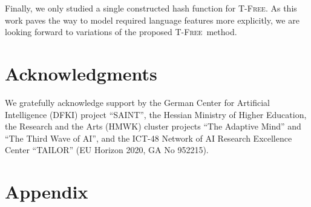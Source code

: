 \documentclass[11pt]{article}
\newcommand{\mb}[1]{\textcolor{blue}{MB: #1}}
\newcommand{\method}{\textsc{T-Free}}
\begin{document}

Finally, we only studied a single constructed hash function for \method. As this work paves the way to model required language features more explicitly, we are looking forward to variations of the proposed \method~method.


\section*{Acknowledgments}


We gratefully acknowledge support by the German Center for Artificial Intelligence (DFKI) project “SAINT”,
the Hessian Ministry of Higher Education, the Research and the Arts (HMWK) cluster projects
“The Adaptive Mind” and “The Third Wave of AI”, and the ICT-48 Network of AI Research Excellence Center “TAILOR” (EU Horizon 2020, GA No 952215). 











\clearpage

\appendix

\section*{Appendix}
\end{document}

